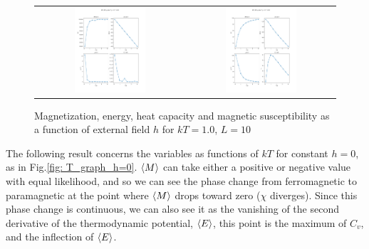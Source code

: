 \documentclass{article}
\theoremstyle{definition}
\theoremstyle{remark}
\begin{document}
\begin{figure}
    \begin{flushleft}
    \begin{tabular}{cc}
    \includegraphics[width=0.5\textwidth]{h_graph_T=1.0.pdf} & \includegraphics[width=0.5\textwidth]{h_graph_T=4.0.pdf} \\
    \end{tabular}
    \caption{\label{fig: h_graph_T=1.0,4.0}Magnetization, energy, heat capacity and magnetic susceptibility as a function of external field $h$ for $kT=1.0$, $L=10$}
    \end{flushleft}
\end{figure}
\indent The following result concerns the variables as functions of $kT$ for constant $h=0$, as in Fig.\ref{fig: T_graph_h=0}. $\braket{M}$ can take either a positive or negative value with equal likelihood, and so we can see the phase change from ferromagnetic to paramagnetic at the point where $\braket{M}$ drops toward zero ($\chi$ diverges). Since this phase change is continuous, we can also see it as the vanishing of the second derivative of the thermodynamic potential, $\braket{E}$, this point is the maximum of $C_v$, and the inflection of $\braket{E}$.
\end{document}

